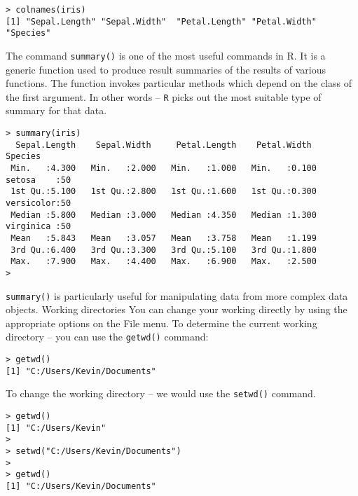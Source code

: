 \documentclass{article}
\begin{document}
\begin{framed}
\begin{verbatim}
> colnames(iris)
[1] "Sepal.Length" "Sepal.Width"  "Petal.Length" "Petal.Width"  "Species"

\end{verbatim}
\end{framed}
The command \texttt{summary()} is one of the most useful commands in R. It is a generic function used to produce result summaries of the results of various functions. The function invokes particular methods which depend on the class of the first argument. 
In other words – \texttt{R} picks out the most suitable type of summary for that data.
{
	\small
\begin{framed}
\begin{verbatim}
> summary(iris)
  Sepal.Length    Sepal.Width     Petal.Length    Petal.Width          Species  
 Min.   :4.300   Min.   :2.000   Min.   :1.000   Min.   :0.100   setosa    :50  
 1st Qu.:5.100   1st Qu.:2.800   1st Qu.:1.600   1st Qu.:0.300   versicolor:50  
 Median :5.800   Median :3.000   Median :4.350   Median :1.300   virginica :50  
 Mean   :5.843   Mean   :3.057   Mean   :3.758   Mean   :1.199                  
 3rd Qu.:6.400   3rd Qu.:3.300   3rd Qu.:5.100   3rd Qu.:1.800                  
 Max.   :7.900   Max.   :4.400   Max.   :6.900   Max.   :2.500                  
>
\end{verbatim}
\end{framed}
}

\texttt{summary()} is particularly useful for manipulating data from more complex data objects.
Working directories
You can change your working directly by using the appropriate options on the File menu.
To determine the current working directory – you can use the \texttt{getwd()} command:	
\begin{framed}
\begin{verbatim}
> getwd()
[1] "C:/Users/Kevin/Documents"
\end{verbatim}
\end{framed}
To change the working directory – we would use the \texttt{setwd()} command.
\begin{framed}
\begin{verbatim}
> getwd()
[1] "C:/Users/Kevin"
>
> setwd("C:/Users/Kevin/Documents")
>
> getwd()
[1] "C:/Users/Kevin/Documents"
\end{verbatim}
\end{framed}
\end{document}

